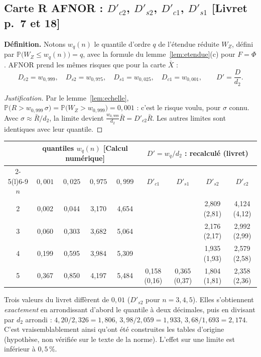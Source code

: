 \documentclass[11pt,a4paper]{article}
\theoremstyle{tq}
\theoremstyle{remark}
\newcommand{\num}{\textcolor{uimmblue}{\textbf{[Calcul numérique]}}}
\newcommand{\liv}[1]{\textcolor{uimmblue}{\small[Livret p.~#1]}}
\renewcommand{\P}{\mathbb{P}}
\newcommand{\Rb}{\bar{R}}
\begin{document}
\subsection{Carte R AFNOR : $D'_{c2}$, $D'_{s2}$, $D'_{c1}$, $D'_{s1}$ \liv{7 et 18}}
\textbf{Définition.} Notons $w_q(n)$ le quantile d'ordre $q$ de l'étendue réduite $W_Z$, défini par $\P\big(W_Z\le w_q(n)\big)=q$, avec la formule du lemme~\ref{lem:etendue}(c) pour $F=\Phi$. AFNOR prend les mêmes risques que pour la carte $\bar X$ :
\[
D_{c2}=w_{0{,}999},\quad D_{s2}=w_{0{,}975},\quad D_{s1}=w_{0{,}025},\quad D_{c1}=w_{0{,}001},\qquad D'=\frac{D}{d_2}.
\]
\begin{proof}[Justification]
Par le lemme~\ref{lem:echelle}, $\P\big(R>w_{0{,}999}\,\sigma\big)=\P\big(W_Z>w_{0{,}999}\big)=0{,}001$ : c'est le risque voulu, pour $\sigma$ connu. Avec $\sigma\approx\Rb/d_2$, la limite devient $\frac{w_{0{,}999}}{d_2}\Rb=D'_{c2}\Rb$. Les autres limites sont identiques avec leur quantile.
\end{proof}
\begin{center}\small
\begin{tabular}{@{}c cccc cccc@{}}
\toprule
& \multicolumn{4}{c}{quantiles $w_q(n)$ \num{}} & \multicolumn{4}{c}{$D'=w_q/d_2$ : recalculé (livret)}\\
\cmidrule(lr){2-5}\cmidrule(l){6-9}
$n$ & $0{,}001$ & $0{,}025$ & $0{,}975$ & $0{,}999$ & $D'_{c1}$ & $D'_{s1}$ & $D'_{s2}$ & $D'_{c2}$\\
\midrule
2 & 0,002 & 0,044 & 3,170 & 4,654 & & & 2,809 (2,81) & 4,124 (4,12)\\
3 & 0,060 & 0,303 & 3,682 & 5,064 & & & 2,176 (2,17) & 2,992 (2,99)\\
4 & 0,199 & 0,595 & 3,984 & 5,309 & & & 1,935 (1,93) & 2,579 (2,58)\\
5 & 0,367 & 0,850 & 4,197 & 5,484 & 0,158 (0,16) & 0,365 (0,37) & 1,804 (1,81) & 2,358 (2,36)\\
\bottomrule
\end{tabular}
\end{center}
Trois valeurs du livret diffèrent de $0{,}01$ ($D'_{s2}$ pour $n=3,4,5$). Elles s'obtiennent \emph{exactement} en arrondissant d'abord le quantile à deux décimales, puis en divisant par $d_2$ arrondi : $4{,}20/2{,}326=1{,}806$, $3{,}98/2{,}059=1{,}933$, $3{,}68/1{,}693=2{,}174$. C'est vraisemblablement ainsi qu'ont été construites les tables d'origine (hypothèse, non vérifiée sur le texte de la norme). L'effet sur une limite est inférieur à $0{,}5\,\%$.
\end{document}
